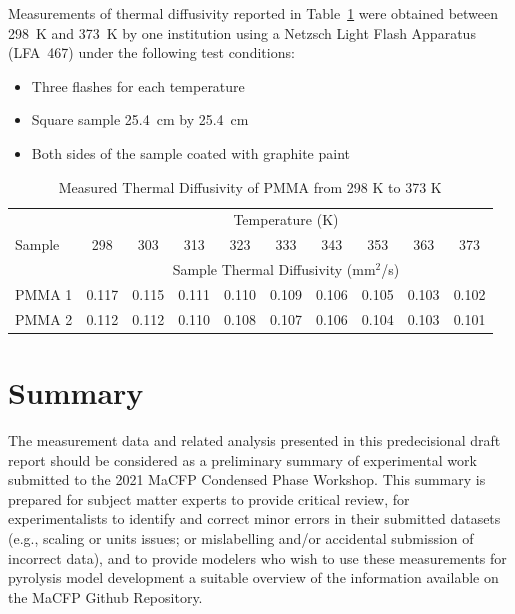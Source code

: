 \documentclass{book}
\begin{document}
Measurements of thermal diffusivity reported in Table~\ref{Table_15} were obtained between 298~K and 373~K by one institution using a Netzsch Light Flash Apparatus (LFA~467) under the following test conditions:
\begin{itemize}
 \item Three flashes for each temperature
 \item Square sample 25.4~cm by 25.4~cm
 \item Both sides of the sample coated with graphite paint
\end{itemize}

\begin{table}[ht]
\caption{Measured Thermal Diffusivity of PMMA from 298 K to 373 K}
\label{Table_15}
\begin{center}
\begin{tabular}{|l|ccccccccc|}
\hline
        & \multicolumn{9}{|c|}{Temperature (K)}                                 \\ \cline{2-10}
Sample  & 298  & 303  & 313  & 323  & 333  & 343  & 353  & 363  & 373           \\ \cline{2-10}
        & \multicolumn{9}{|c|}{Sample Thermal Diffusivity (mm$^2$/s)}           \\ \hline
PMMA 1  & 0.117 & 0.115 & 0.111 & 0.110 & 0.109 & 0.106 & 0.105 & 0.103 & 0.102 \\
PMMA 2  & 0.112 & 0.112 & 0.110 & 0.108 & 0.107 & 0.106 & 0.104 & 0.103 & 0.101 \\ \hline
\end{tabular}
\end{center}
\end{table}

\chapter{Summary}

The measurement data and related analysis presented in this predecisional draft report should be considered as a preliminary summary of experimental work submitted to the 2021 MaCFP Condensed Phase Workshop. This summary is prepared for subject matter experts to provide critical review, for experimentalists to identify and correct minor errors in their submitted datasets (e.g., scaling or units issues; or mislabelling and/or accidental submission of incorrect data), and to provide modelers who wish to use these measurements for pyrolysis model development a suitable overview of the information available on the MaCFP Github Repository.
\end{document}
